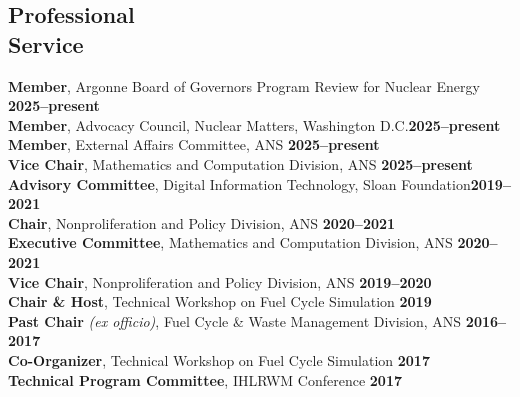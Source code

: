 \documentclass[margin,line]{resume}
\begin{document}
\begin{resume}
    \section{\mysidestyle Professional\\Service}
                \textbf{Member}, Argonne Board of Governors Program Review for Nuclear Energy \hfill \textbf{2025--present}\vspace{.5mm}\\%
                \textbf{Member}, Advocacy Council, Nuclear Matters, Washington D.C.\hfill \textbf{2025--present}\vspace{.5mm}\\%
                \textbf{Member}, External Affairs Committee, ANS  \hfill \textbf{2025--present}\vspace{.5mm}\\%
                \textbf{Vice Chair}, Mathematics and Computation Division, ANS  \hfill \textbf{2025--present}\vspace{.5mm}\\%
            \textbf{Advisory Committee}, Digital Information Technology, Sloan Foundation\hfill\textbf{2019--2021}\vspace{.5mm}\\%
                \textbf{Chair}, Nonproliferation and Policy Division, ANS  \hfill \textbf{2020--2021}\vspace{.5mm}\\%
                \textbf{Executive Committee}, Mathematics and Computation Division, ANS  \hfill \textbf{2020--2021}\vspace{.5mm}\\%
                \textbf{Vice Chair}, Nonproliferation and Policy Division, ANS  \hfill \textbf{2019--2020}\vspace{.5mm}\\%
                \textbf{Chair \& Host}, Technical Workshop on Fuel Cycle Simulation \hfill \textbf{2019}\vspace{.5mm}\\%
    \textbf{Past Chair} \emph{(ex officio)}, Fuel Cycle \& Waste Management Division, ANS  \hfill \textbf{2016--2017}\vspace{.5mm}\\%
                \textbf{Co-Organizer}, Technical Workshop on Fuel Cycle Simulation \hfill \textbf{2017}\vspace{.5mm}\\%
                \textbf{Technical Program Committee}, IHLRWM Conference \hfill \textbf{2017}\vspace{.5mm}\\%

\end{resume}
\end{document}
